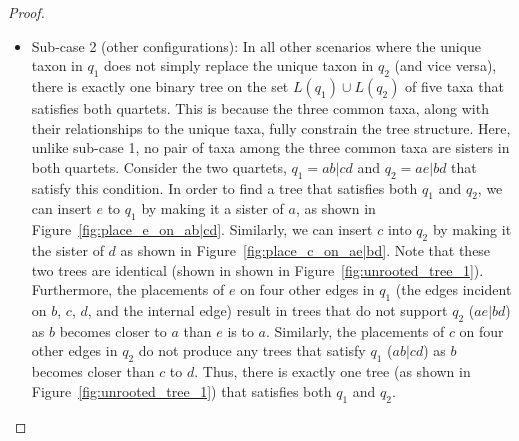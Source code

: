 \documentclass[10pt,a4paper]{article}
\begin{document}
\begin{proof}
\begin{itemize}
\begin{itemize}
    \item Sub-case 2 (other configurations): In all other scenarios where the unique taxon in $q_1$ does not simply replace the unique taxon in $q_2$ (and vice versa), there is exactly one binary tree on the set $L(q_1)\cup L(q_2)$ of five taxa that satisfies both quartets. This is because the three common taxa, along with their relationships to the unique taxa, fully constrain the tree structure. Here, unlike sub-case 1, no pair of taxa among the three common taxa are sisters in both quartets. Consider the two quartets, $q_1 = ab|cd$ and $q_2 =  ae|bd$ %
    that satisfy this condition. %
    In order to find a tree that satisfies both $q_1$ and $q_2$, we can insert $e$ to $q_1$ by making it a sister of $a$, as shown in Figure~\ref{fig:place_e_on_ab|cd}. Similarly, we can insert $c$ into $q_2$ by making it the sister of $d$ as shown in Figure~\ref{fig:place_c_on_ae|bd}. Note that these two trees are identical (shown in shown in Figure~\ref{fig:unrooted_tree_1}). Furthermore, the placements of $e$ on four other edges in $q_1$ (the edges incident on $b$, $c$, $d$, and the internal edge) result in trees that do not support $q_2$ ($ae|bd$) as $b$ becomes closer to $a$ than $e$ is to $a$. Similarly, the placements of $c$ on four other edges in $q_2$ do not produce any trees that satisfy $q_1$ ($ab|cd$) as  $b$ becomes closer than $c$ to $d$. Thus, there is exactly one tree (as shown in Figure~\ref{fig:unrooted_tree_1}) that satisfies both $q_1$ and $q_2$.


    \end{itemize}



\end{itemize}

\end{proof}
\end{document}
